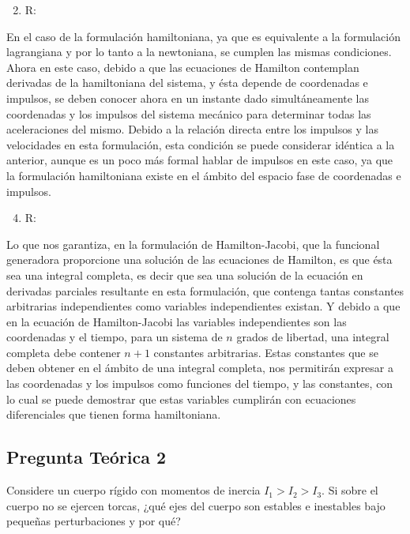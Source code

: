 \documentclass[a4paper,10pt]{article}
\numberwithin{equation}{section}
\begin{document}
\begin{enumerate}[label=\alph*)]
  \setcounter{enumi}{1}
 \item R:
\end{enumerate}

En el caso de la formulación hamiltoniana, ya que es equivalente a la formulación 
lagrangiana y por lo tanto a la newtoniana, se cumplen las mismas condiciones. Ahora 
en este caso, debido a que las ecuaciones de Hamilton contemplan derivadas de la 
hamiltoniana del sistema, y ésta depende de coordenadas e impulsos, se deben conocer 
ahora en un instante dado simultáneamente las coordenadas y los impulsos del sistema 
mecánico para determinar todas las aceleraciones del mismo. Debido a la relación 
directa entre los impulsos y las velocidades en esta formulación, esta condición 
se puede considerar idéntica a la anterior, aunque es un poco más formal hablar de 
impulsos en este caso, ya que la formulación hamiltoniana existe en el ámbito del 
espacio fase de coordenadas e impulsos.

\begin{enumerate}[label=\alph*)]
  \setcounter{enumi}{3}
 \item R:
\end{enumerate}

Lo que nos garantiza, en la formulación de Hamilton-Jacobi, que la funcional generadora 
proporcione una solución de las ecuaciones de Hamilton, es que ésta sea una integral 
completa, es decir que sea una solución de la ecuación en derivadas parciales resultante 
en esta formulación, que contenga tantas constantes arbitrarias independientes como 
variables independientes existan. Y debido a que en la ecuación de Hamilton-Jacobi 
las variables independientes son las coordenadas y el tiempo, para un sistema de 
$n$ grados de libertad, una integral completa debe contener $n+1$ constantes arbitrarias. 
Estas constantes que se deben obtener en el ámbito de una integral completa, nos permitirán 
expresar a las coordenadas y los impulsos como funciones del tiempo, y las constantes, 
con lo cual se puede demostrar que estas variables cumplirán con ecuaciones 
diferenciales que tienen forma hamiltoniana.

\subsection{Pregunta Teórica 2}

Considere un cuerpo rígido con momentos de inercia $I_1 > I_2 > I_3$. Si sobre el cuerpo no se 
ejercen torcas, ¿qué ejes del cuerpo son estables e inestables bajo pequeñas perturbaciones y 
por qué?
\end{document}
